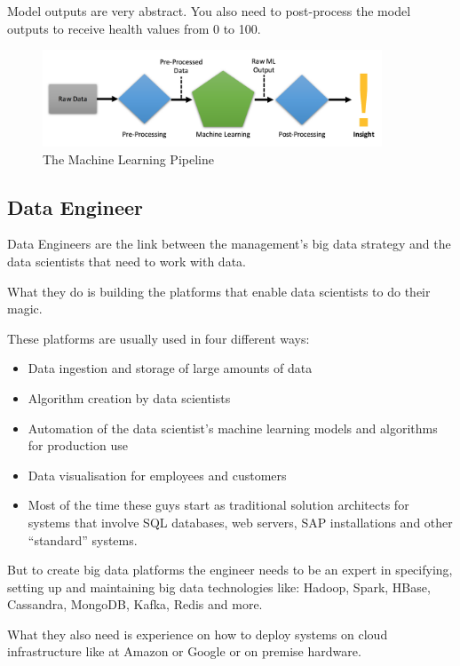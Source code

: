 \documentclass[12pt]{scrartcl} %
\begin{document}
Model outputs are very abstract. You also need to post-process the model outputs to receive health values from 0 to 100.

\begin{figure}[htbp]
  \centering
     \includegraphics[width=0.9\textwidth]{images/Machine-Learning-Pipeline}
  \caption{The Machine Learning Pipeline}
  \label{fig:Bild1}
\end{figure}

\subsection{Data Engineer}
Data Engineers are the link between the management’s big data strategy and the data scientists that need to work with data.

What they do is building the platforms that enable data scientists to do their magic.

These platforms are usually used in four different ways:

\begin{itemize}
\item  Data ingestion and storage of large amounts of data
\item Algorithm creation by data scientists
\item Automation of the data scientist’s machine learning models and algorithms for production use
\item Data visualisation for employees and customers
\item  Most of the time these guys start as traditional solution architects for systems that involve SQL databases, web servers, SAP installations and other “standard” systems.
\end{itemize}

But to create big data platforms the engineer needs to be an expert in specifying, setting up and maintaining big data technologies like: Hadoop, Spark, HBase, Cassandra, MongoDB, Kafka, Redis and more.

What they also need is experience on how to deploy systems on cloud infrastructure like at Amazon or Google or on premise hardware.
\end{document}
